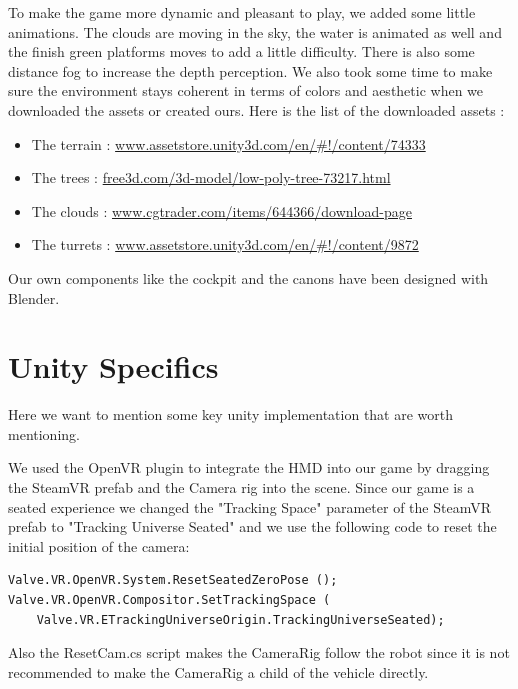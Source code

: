 \documentclass[12pt]{article}
\begin{document}
To make the game more dynamic and pleasant to play, we added some little animations. The clouds are moving in the sky, the water is animated as well and the finish green platforms moves to add a little difficulty. There is also some distance fog to increase the depth perception. We also took some time to make sure the environment stays coherent in terms of colors and aesthetic when we downloaded the assets or created ours. Here is the list of the downloaded assets :

\begin{itemize}
	\item The terrain : \href{https://www.assetstore.unity3d.com/en/#!/content/74333}{www.assetstore.unity3d.com/en/\#!/content/74333}
	\item The trees : \href{https://free3d.com/3d-model/low-poly-tree-73217.html}{free3d.com/3d-model/low-poly-tree-73217.html}
	\item The clouds : \href{https://www.cgtrader.com/items/644366/download-page}{www.cgtrader.com/items/644366/download-page}
	\item The turrets : \href{https://www.assetstore.unity3d.com/en/#!/content/9872}{www.assetstore.unity3d.com/en/\#!/content/9872}
\end{itemize}

Our own components like the cockpit and the canons have been designed with Blender.

\section{Unity Specifics}

Here we want to mention some key unity implementation that are worth mentioning.

We used the OpenVR plugin to integrate the HMD into our game by dragging the SteamVR prefab and the Camera rig into the scene. Since our game is a seated experience we changed the "Tracking Space" parameter of the SteamVR prefab to "Tracking Universe Seated" and we use the following code to reset the initial position of the camera:

\begin{lstlisting}
Valve.VR.OpenVR.System.ResetSeatedZeroPose ();
Valve.VR.OpenVR.Compositor.SetTrackingSpace (
    Valve.VR.ETrackingUniverseOrigin.TrackingUniverseSeated);
\end{lstlisting}

Also the ResetCam.cs script makes the CameraRig follow the robot since it is not recommended to make the CameraRig a child of the vehicle directly.
\end{document}
